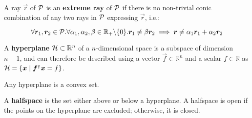 \begin{definition}
A ray $\vec{r}$ of $\mathcal{P}$ is an \textbf{extreme ray} of $\mathcal{P}$ if there is no non-trivial conic combination of any two rays in $\mathcal{P}$ expressing $\vec{r}$, i.e.:

\begin{equation*}
\forall {\bm{r}}_1, {\bm{r}}_2 \in \mathcal{P}. \forall \alpha_1, \alpha_2, \beta \in \mathbb{R}_+ \backslash \{0\}. {\bm{r}}_1 \neq \beta {\bm{r}}_2 \implies {\bm{r}} \neq \alpha_1 {\bm{r}}_1 + \alpha_2 {\bm{r}}_2
\end{equation*}
\end{definition}

\begin{definition}
A \textbf{hyperplane} $\mathcal{H} \subset \mathbb{R}^n$ of a $n$-dimensional space is a subspace of dimension $n-1$, and can therefore be described using a vector $\vec{f} \in \mathbb{R}^n$ and a scalar $f \in \mathbb{R}$ as $\polyhedron{H} = \{\vec{x} \mid \vec{f}\transpose \vec{x} = f\}$.
\end{definition}

\begin{corollary}
Any hyperplane is a convex set.
\end{corollary}

\iffalse
\begin{proof}
Let $\polyhedron{H} = \{\vec{x} \mid \vec{f}\transpose \vec{x} = f\}$ be a hyperplane. Let $k \in \mathbb{N}$, $\vec{x}_1, \dots, \vec{x}_k \in \polyhedron{H}$. For any $\alpha_1, \dots, \alpha_k \in \mathbb{R}_+$ with $\sum_{i=1}^{k} \alpha_i = 1$:

\begin{align*}
\vec{f}\transpose \left( \sum_{i=1}^{k} \alpha_i \vec{x}_i \right)
&= \sum_{i=1}^{k} \alpha_i \vec{f}\transpose \vec{x}_i \\
&= \sum_{i=1}^{k} \alpha_i \cdot f \\
&= f \cdot \sum_{i=1}^{k} \alpha_i \\
&= f
\end{align*}

Therefore, the convex combination $\sum_{i=1}^{k} \alpha_i \vec{x}_i$ is in the hyperplane $\polyhedron{H}$.
\end{proof}
\fi

\begin{definition}
A \textbf{halfspace} is the set either above or below a hyperplane. A halfspace is open if the points on the hyperplane are excluded; otherwise, it is closed.
\end{definition}

